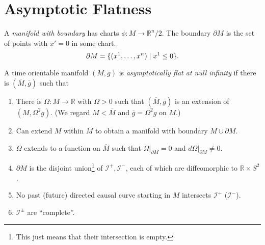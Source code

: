 
\section{Asymptotic Flatness}%
\label{sec:asymptotic_flatness}

\begin{definition}
  A \emph{manifold with boundary} has charts $\phi \colon M \to \mathbb{R}^n / 2$.
  The boundary $\partial M$ is the set of points with $x' = 0$ in some chart.
  \begin{equation}
    \partial M = \{(x^1, \dots, x^n) \suchthat x^1 \leq 0\}.
  \end{equation}
\end{definition}

\begin{definition}
  A time orientable manifold $(M, g)$  is \emph{asymptotically flat at null infinity} if there is $(\overline{M}{}, \overline{g}{})$  such that
  \begin{enumerate}[1.]
    \item There is $\Omega \colon M \to \mathbb{R}$ with $\Omega > 0$ such that $(\overline{M}{}, \overline{g}{})$ is an extension of $(M, \Omega^2 g)$.
      (We regard $M < \overline{M}{}$ and $\overline{g}{} = \Omega^2 g$ on $M$.)
    \item Can extend $M$ within $\overline{M}{}$ to obtain a manifold with boundary $M \cup \partial M$.
    \item $\Omega$ extends to a function on $\overline{M}{}$ such that $\Omega\rvert_{\partial M} = 0$ and $d \Omega \rvert_{\partial M} \neq 0$.
    \item $\partial M$ is the disjoint union\footnote{This just means that their intersection is empty.} of $\mathscr{I}^+, \mathscr{I}^-$, each of which are diffeomorphic to $\mathbb{R} \times S^2$.
    \item No past (future) directed causal curve starting in $M$ intersects $\mathscr{I}^+$ ($\mathscr{I}^-$).
    \item $\mathscr{I}^\pm$ are ``complete''.
  \end{enumerate}
\end{definition}

